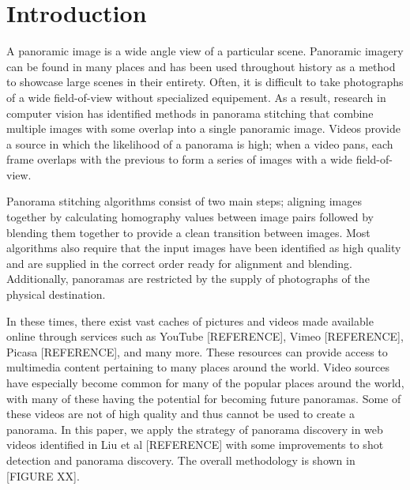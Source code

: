 \section{Introduction}
A panoramic image is a wide angle view of a particular scene. Panoramic imagery can be found in many places 
and has been used throughout history as a method to showcase large scenes in their entirety. Often, it is 
difficult to take photographs of a wide field-of-view without specialized equipement. As a result, research
in computer vision has identified methods in panorama stitching that combine multiple images with some 
overlap into a single panoramic image. Videos provide a source in which the likelihood of a panorama is high;
when a video pans, each frame overlaps with the previous to form a series of images with a wide field-of-view.
\par
Panorama stitching algorithms consist of two main steps; aligning images together by calculating homography
values between image pairs followed by blending them together to provide a clean transition between images.
Most algorithms also require that the input images have been identified as high quality and are supplied in 
the correct order ready for alignment and blending. Additionally, panoramas are restricted by the supply of
photographs of the physical destination. 
\par 
In these times, there exist vast caches of pictures and videos made available online through services such as
YouTube [REFERENCE], Vimeo [REFERENCE], Picasa [REFERENCE], and many more. These resources can provide access
to multimedia content pertaining to many places around the world. Video sources have especially become common
for many of the popular places around the world, with many of these having the potential for becoming future
panoramas. Some of these videos are not of high quality and thus cannot be used to create a panorama. In this
paper, we apply the strategy of panorama discovery in web videos identified in Liu et al [REFERENCE] with 
some improvements to shot detection and panorama discovery. The overall methodology is shown in [FIGURE XX].
\par
